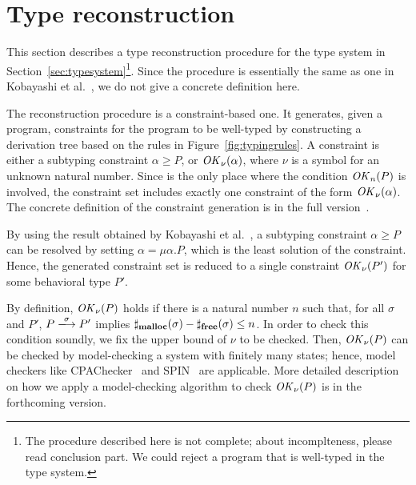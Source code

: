 \section{Type reconstruction}
\label{sec:reconstruction}


This section describes a type reconstruction procedure for the type
system in Section~\ref{sec:typesystem}\footnote{The procedure
  described here is not complete; about incomplteness, please read
  conclusion part.  We could reject a program that is well-typed in
  the type system.}.  Since the procedure is essentially the same as
one in Kobayashi et al.~\cite{DBLP:journals/lmcs/KobayashiSW06}, we do
not give a concrete definition here.

The reconstruction procedure is a constraint-based one.  It generates,
given a program, constraints for the program to be well-typed by
constructing a derivation tree based on the rules in
Figure~\ref{fig:typingrules}.  A constraint is either a subtyping
constraint \(\alpha \ge P\), or \(\mathit{OK}_\nu(\alpha)\), where \(\nu\) is
a symbol for an unknown natural number.  Since  is the only
place where the condition \(\mathit{OK}_n(P)\) is involved, the constraint set
includes exactly one constraint of the form \(\mathit{OK}_\nu(\alpha)\).  The
concrete definition of the constraint generation is in the full
version~\cite{fullversion}.

By using the result obtained by Kobayashi et al.~\cite[Lemma
  3.8]{DBLP:journals/lmcs/KobayashiSW06}, a subtyping constraint
\(\alpha \ge P\) can be resolved by setting \(\alpha = \mu
\alpha. P\), which is the least solution of the constraint.  Hence,
the generated constraint set is reduced to a single constraint
\(\mathit{OK}_{\nu}(P')\) for some behavioral type \(P'\).

By definition, \(\mathit{OK}_{\nu}(P)\) holds if there is a natural number
\(n\) such that, for all \(\sigma\) and \(P'\), \(P
\xlongrightarrow{\sigma} P'\) implies \(\sharp_{\mathbf{malloc}}(\sigma) -
\sharp_{\mathbf{free}}(\sigma) \le n\).  In order to check this condition
soundly, we fix the upper bound of \(\nu\) to be checked.  Then,
\(\mathit{OK}_{\nu}(P)\) can be checked by model-checking a system with
finitely many states; hence, model checkers like
CPAChecker~\cite{beyer2011cpachecker} and
SPIN~\cite{holzmann2004spin,ben2008principles} are
applicable.  More detailed description on how we apply a
model-checking algorithm to check \(\mathit{OK}_\nu(P)\) is in the forthcoming
version.

